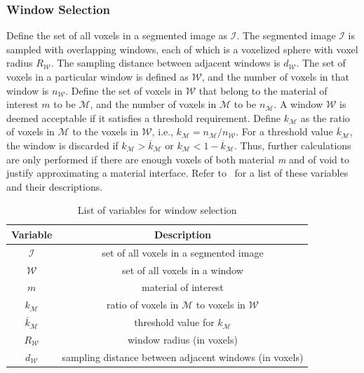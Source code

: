 \subsubsection{Window Selection}

Define the set of all voxels in a segmented image as $\mathcal{I}$. The segmented image  $\mathcal{I}$ is sampled with overlapping windows, each of which is a voxelized sphere with voxel radius $R_{\mathcal{W}}$. The sampling distance between adjacent windows is $d_{\mathcal{W}}$. The set of voxels in a particular window is defined as $\mathcal{W}$, and the number of voxels in that window is $n_{\mathcal{W}}$. Define the set of voxels in $\mathcal{W}$ that belong to the material of interest $m$ to be $\mathcal{M}$, and the number of voxels in $\mathcal{M}$ to be $n_{\mathcal{M}}$. A window $\mathcal{W}$ is deemed acceptable if it satisfies a threshold requirement. Define $k_{\mathcal{M}}$ as the ratio of voxels in $\mathcal{M}$ to the voxels in $\mathcal{W}$, i.e., $k_{\mathcal{M}} = n_{\mathcal{M}}/n_{\mathcal{W}}$. For a threshold value $\overline{k}_{\mathcal{M}}$, the window is discarded if $k_{\mathcal{M}} > \overline{k}_{\mathcal{M}}$ or $k_{\mathcal{M}} < 1 - \overline{k}_{\mathcal{M}}$. Thus, further calculations are only performed if there are enough voxels of both material \textit{m} and of void to justify approximating a material interface. Refer to~ for a list of these variables and their descriptions. 

\begin{table}[htbp!]
 \centering
   \begin{tabular}{|c||c|}
   \hline
   {\textbf{Variable}} & \textbf{Description} \\ \hline \hline
   $\mathcal{I}$ & set of all voxels in a segmented image \\ \hline
   $\mathcal{W}$ & set of all voxels in a window \\ \hline
   $m$ & material of interest \\ \hline
   {$k_{\mathcal{M}}$} & ratio of voxels in $\mathcal{M}$ to voxels in $\mathcal{W}$\\ \hline
   {$\overline{k}_{\mathcal{M}}$ \rule{0mm}{4mm}} & threshold value for $k_{\mathcal{M}}$ \\ \hline 
   $R_{\mathcal{W}}$ & window radius (in voxels) \\ \hline
   $d_{\mathcal{W}}$ & sampling distance between adjacent windows (in voxels) \\ \hline  
\end{tabular}
\caption{List of variables for window selection}
\label{tab:window}
\end{table}

